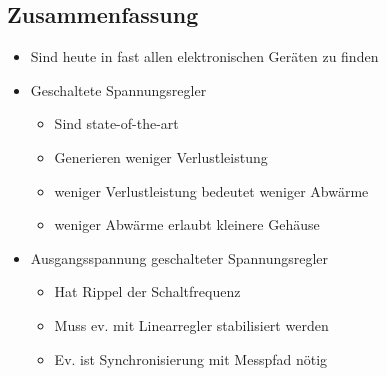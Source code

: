\subsection{Zusammenfassung}
\begin{itemize}
  \item Sind heute in fast allen elektronischen Geräten zu finden
  \item Geschaltete Spannungsregler
  \begin{itemize}
    \item Sind state-of-the-art
    \item Generieren weniger Verlustleistung
    \item weniger Verlustleistung bedeutet weniger Abwärme
    \item weniger Abwärme erlaubt kleinere Gehäuse
   \end{itemize}
   \item Ausgangsspannung geschalteter Spannungsregler
   \begin{itemize}
     \item Hat Rippel der Schaltfrequenz
     \item Muss ev. mit Linearregler stabilisiert werden
     \item Ev. ist Synchronisierung mit Messpfad nötig
   \end{itemize}
\end{itemize}